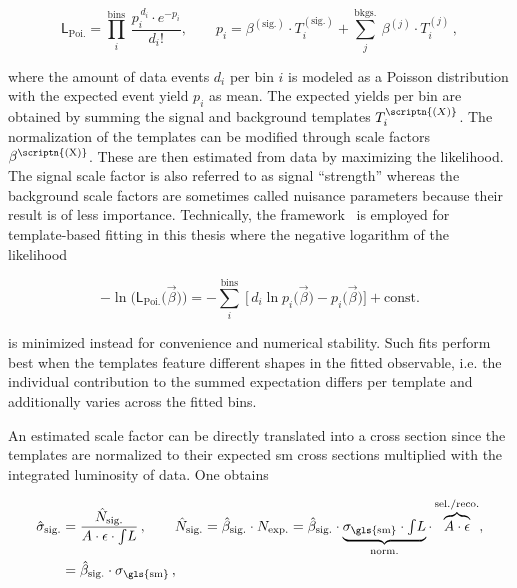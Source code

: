 \begin{equation}
\mathsf{L}_\mathrm{Poi.}=\prod_{i}^\mathrm{bins}~\frac{p_{i}^{\,d_{i}}\cdot e^{-p_{i}}}{d_{i}!},\qquad p_{i}=\beta^{\mathrm{(sig.)}}\cdot T^{\mathrm{(sig.)}}_{i}+\sum_{j}^\mathrm{bkgs.}~\beta^{(j)}\cdot T^{(j)}_{i} \,, \label{eq:technique-likelihood}
\end{equation}

where the amount of data events $d_{i}$ per bin $i$ is modeled as a Poisson distribution with the expected event yield $p_{i}$ as mean. The expected yields per bin are obtained by summing the signal and background templates $T^\scriptn{(X)}_{i}$. The normalization of the templates can be modified through scale factors $\beta^\scriptn{\mathrm{(X)}}$. These are then estimated from data by maximizing the likelihood. The signal scale factor is also referred to as signal ``strength'' whereas the background scale factors are sometimes called nuisance parameters because their result is of less importance. Technically, the \THETA[format=hyperbf] framework~\cite{theta} is employed for template-based fitting in this thesis where the negative logarithm of the likelihood

\begin{equation}
-\ln\Big(\mathsf{L}_\mathrm{Poi.}\big(\vec{\beta}\big)\Big)=-\sum_{i}^\mathrm{bins}~\Big[\,d_{i}\ln p_{i}\big(\vec{\beta}\big)-p_{i}\big(\vec{\beta}\big)\Big]+\mathrm{const.}
\end{equation}

is minimized instead for convenience and numerical stability. Such fits perform best when the templates feature different shapes in the fitted observable, i.e. the individual contribution to the summed expectation differs per template and additionally varies across the fitted bins. 

An estimated scale factor can be directly translated into a cross section since the templates are normalized to their expected \gls{sm} cross sections multiplied with the integrated luminosity of data. One obtains

\begin{align}
\hat{\sigma}_\mathrm{sig.}&=\frac{\hat{N}_\mathrm{sig.}}{A\cdot\epsilon\cdot{\textstyle{\int}L}}\,,\qquad
\hat{N}_\mathrm{sig.}=\hat{\beta}_\mathrm{sig.}\cdot N_\mathrm{exp.}=\hat{\beta}_\mathrm{sig.}\cdot\underbrace{\sigma_\mathrm{\gls{sm}}\cdot\textstyle{\int}L}_\mathrm{norm.}\cdot \overbrace{A \cdot \epsilon}^\mathrm{sel./reco.},\nonumber\\
&=\hat{\beta}_\mathrm{sig.}\cdot\sigma_\mathrm{\gls{sm}}\,, \label{eq:technique-xsec-measurement}
\end{align}

